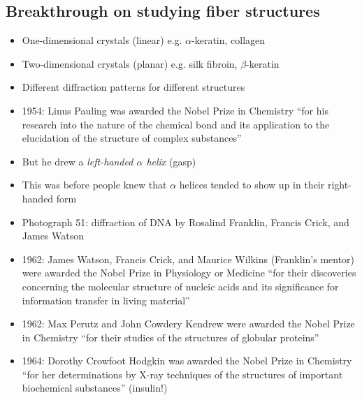 \documentclass[letterpaper, 12pt]{article}
\begin{document}
\subsection*{Breakthrough on studying fiber structures}
\begin{itemize}
\item One-dimensional crystals (linear) e.g. $\alpha$-keratin, collagen
\item Two-dimensional crystals (planar) e.g. silk fibroin, $\beta$-keratin
\item Different diffraction patterns for different structures
\item 1954: Linus Pauling was awarded the Nobel Prize in Chemistry ``for his research into the nature of the chemical bond and its application to the elucidation of the structure of complex substances''
\item But he drew a \textit{left-handed $\alpha$ helix} (gasp)
\item This was before people knew that $\alpha$ helices tended to show up in their right-handed form
\item Photograph 51: diffraction of DNA by Rosalind Franklin, Francis Crick, and James Watson
\item 1962: James Watson, Francis Crick, and Maurice Wilkins (Franklin's mentor) were awarded the Nobel Prize in Physiology or Medicine ``for their discoveries concerning the molecular structure of nucleic acids and its significance for information transfer in living material''
\item 1962: Max Perutz and John Cowdery Kendrew were awarded the Nobel Prize in Chemistry ``for their studies of the structures of globular proteins''
\item 1964: Dorothy Crowfoot Hodgkin was awarded the Nobel Prize in Chemistry ``for her determinations by X-ray techniques of the structures of important biochemical substances'' (insulin!)
\end{itemize}
\end{document}
